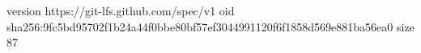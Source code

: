 version https://git-lfs.github.com/spec/v1
oid sha256:9fc5bd95702f1b24a44f0bbe80bf57ef3044991120f6f1858d569e881ba56ea0
size 87
